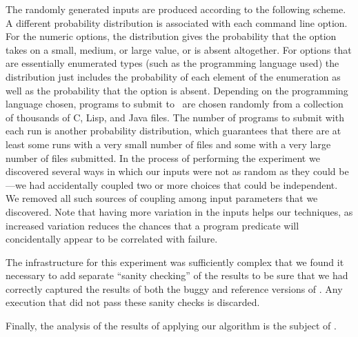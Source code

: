 The randomly generated inputs are produced according to the following
scheme.  A different probability distribution is associated with each
command line option.  For the numeric options, the distribution gives
the probability that the option takes on a small, medium, or large
value, or is absent altogether.  For options that are essentially
enumerated types (such as the programming language used) the
distribution just includes the probability of each element of the
enumeration as well as the probability that the option is absent.
Depending on the programming language chosen, programs to submit to
\moss\ are chosen randomly from a collection of thousands of C, Lisp,
and Java files.  The number of programs to submit with each run is
another probability distribution, which guarantees that there are at
least some runs with a very small number of files and some with a very
large number of files submitted.  In the process of performing the
experiment we discovered several ways in which our inputs were not as
random as they could be---we had accidentally coupled two or more
choices that could be independent.  We removed all such sources of
coupling among input parameters that we discovered.  Note that having
more variation in the inputs helps our techniques, as
increased variation reduces the chances that a program predicate will
concidentally appear to be correlated with failure.

The infrastructure for this experiment was sufficiently complex
that we found it necessary to add separate ``sanity checking'' of the results
to be sure that we had correctly captured the results of both the buggy and
reference versions of \moss.  Any execution that did not pass these sanity
checks is discarded.  

Finally, the analysis of the results of applying our algorithm is the
subject of .

